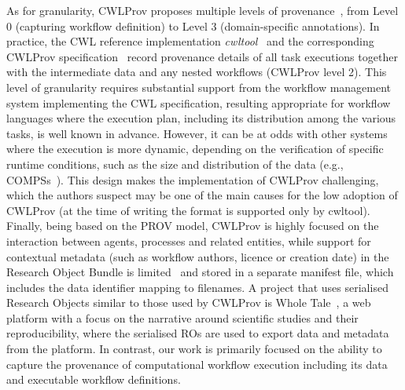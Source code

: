 \documentclass[10pt,letterpaper]{article}
\begin{document}
As for granularity, CWLProv proposes multiple levels of provenance~\cite[Figure 2]{Khan 2019}, from Level 0 (capturing workflow definition) to Level 3 (domain-specific annotations).
In practice, the CWL reference implementation \emph{cwltool}~\cite{Amstutz 2023} and the corresponding CWLProv specification~\cite{Soiland-Reyes 2018} record provenance details of all task executions together with the intermediate data and any nested workflows (CWLProv level 2). This level of granularity requires substantial support from the workflow management system implementing the CWL specification, resulting appropriate for workflow languages where the execution plan, including its distribution among the various tasks, is well known in advance.
However, it can be at odds with other systems where the execution is more dynamic, depending on the verification of specific runtime conditions, such as the size and distribution of the data (e.g., COMPSs~\cite{Lordan 2014}).
This design makes the implementation of CWLProv challenging, which the authors suspect may be one of the main causes for the low adoption of CWLProv (at the time of writing the format is supported only by cwltool).
Finally, being based on the PROV model, CWLProv is highly focused on the interaction between agents, processes and related entities, while support for contextual metadata (such as workflow authors, licence or creation date) in the Research Object Bundle is limited~\cite{rob-context} and stored in a separate manifest file, which includes the data identifier mapping to filenames.
A project that uses serialised Research Objects similar to those used by CWLProv is Whole Tale~\cite{Chard 2019}, a web platform with a focus on the narrative around scientific studies and their reproducibility, where the serialised ROs are used to export data and metadata from the platform. In contrast, our work is primarily focused on the ability to capture the provenance of computational workflow execution including its data and executable workflow definitions.
\end{document}
